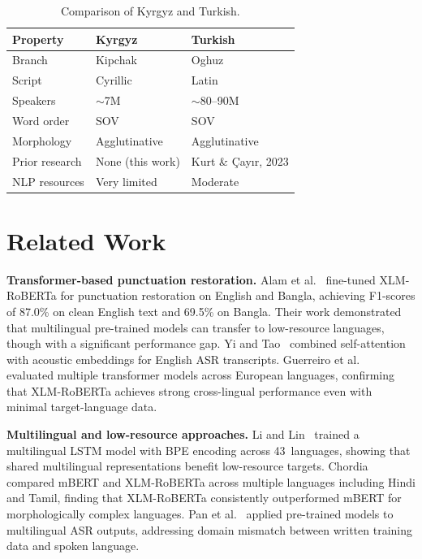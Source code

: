 \documentclass[manuscript, review]{acmart}
\begin{document}
\begin{table}[t]
\caption{Comparison of Kyrgyz and Turkish.}
\label{tab:lang-comparison}
\begin{tabular}{lll}
\toprule
\textbf{Property} & \textbf{Kyrgyz} & \textbf{Turkish} \\
\midrule
Branch        & Kipchak      & Oghuz \\
Script        & Cyrillic     & Latin \\
Speakers      & $\sim$7M     & $\sim$80--90M \\
Word order    & SOV          & SOV \\
Morphology    & Agglutinative & Agglutinative \\
Prior research & None (this work) & Kurt \& \c{C}ay{\i}r, 2023 \\
NLP resources & Very limited & Moderate \\
\bottomrule
\end{tabular}
\end{table}

\section{Related Work}
\label{sec:related}

\textbf{Transformer-based punctuation restoration.}
Alam et al.~\cite{alam2020punctuation} fine-tuned XLM-RoBERTa for punctuation restoration on English and Bangla, achieving F1-scores of 87.0\% on clean English text and 69.5\% on Bangla. Their work demonstrated that multilingual pre-trained models can transfer to low-resource languages, though with a significant performance gap. Yi and Tao~\cite{yi2019self} combined self-attention with acoustic embeddings for English ASR transcripts. Guerreiro et al.~\cite{guerreiro2021subtitles} evaluated multiple transformer models across European languages, confirming that XLM-RoBERTa achieves strong cross-lingual performance even with minimal target-language data.

\textbf{Multilingual and low-resource approaches.}
Li and Lin~\cite{li2020multilingual} trained a multilingual LSTM model with BPE encoding across 43~languages, showing that shared multilingual representations benefit low-resource targets. Chordia~\cite{chordia2021punktuator} compared mBERT and XLM-RoBERTa across multiple languages including Hindi and Tamil, finding that XLM-RoBERTa consistently outperformed mBERT for morphologically complex languages. Pan et al.~\cite{pan2022punctuation} applied pre-trained models to multilingual ASR outputs, addressing domain mismatch between written training data and spoken language.
\end{document}
